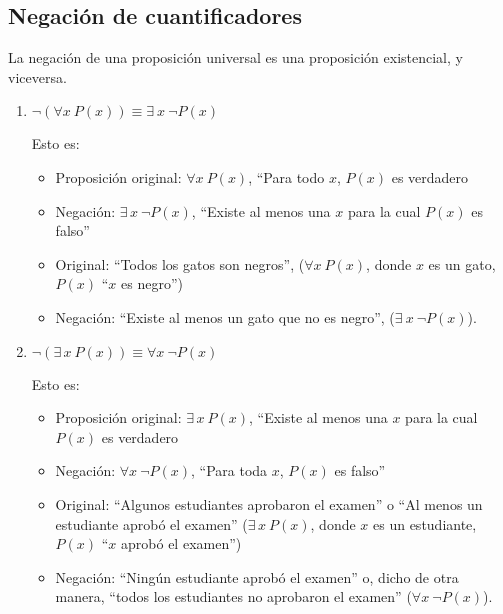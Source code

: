 \subsection{Negación de cuantificadores}
La negación de una proposición universal es una proposición existencial, y viceversa.
\begin{enumerate}[label=\roman*)]
	\item $\neg \left( \forall x \ P(x) \right) \equiv \exists \ x \ \neg P(x)$
	
	Esto es:
	\begin{itemize}
		\item Proposición original: $\forall x \ P(x)$, ``Para todo $x$, $P(x)$ es verdadero
		\item Negación: $\exists \, x \ \neg P(x)$, ``Existe al menos una $x$ para la cual $P(x)$ es falso''
	\end{itemize}
	
	\begin{fmd-example} 
		\begin{itemize}
			\item Original: ``Todos los gatos son negros'', ($\forall x \ P(x)$, donde $x$ es un gato, $P(x)$ ``$x$ es negro'')
			\item Negación: ``Existe al menos un gato que no es negro'', ($\exists \ x \ \neg P(x)$).
		\end{itemize}
	\end{fmd-example}
	
	\item $\neg \left( \exists \, x \ P(x) \right) \equiv \forall x \ \neg P(x)$
	
	Esto es:
	\begin{itemize}
		\item Proposición original: $\exists \, x \ P(x)$, ``Existe al menos una $x$ para la cual $P(x)$ es verdadero
		\item Negación: $\forall x \ \neg P(x)$, ``Para toda $x$, $P(x)$ es falso'' 
	\end{itemize}
	
	\begin{fmd-example} 
		\begin{itemize}
		\item Original: ``Algunos estudiantes aprobaron el examen'' o ``Al menos un estudiante aprobó el examen'' ($\exists \, x \ P(x)$, donde $x$ es un estudiante, $P(x)$ ``$x$ aprobó el examen'')
		
		\item Negación: ``Ningún estudiante aprobó el examen'' o, dicho de otra manera, ``todos los estudiantes no aprobaron el examen'' ($\forall x \ \neg P(x)$).
		\end{itemize}
	\end{fmd-example}
\end{enumerate}


